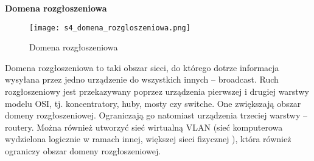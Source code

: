 \textbf{Domena rozgłoszeniowa}

\begin{figure}[H]
	\centering
	\texttt{[image: s4\_domena\_rozgloszeniowa.png]}
	\caption{Domena rozgłoszeniowa}
\end{figure}

Domena rozgłoszeniowa to taki obszar sieci, do którego dotrze informacja wysyłana przez jedno urządzenie do wszystkich innych – broadcast. Ruch rozgłoszeniowy jest przekazywany poprzez urządzenia pierwszej i drugiej warstwy modelu OSI, tj. koncentratory, huby, mosty czy switche. One zwiększają obszar domeny rozgłoszeniowej. Ograniczają go natomiast urządzenia trzeciej warstwy – routery. Można również utworzyć sieć wirtualną VLAN (sieć komputerowa wydzielona logicznie w ramach innej, większej sieci fizycznej ), która również ograniczy obszar domeny rozgłoszeniowej.

